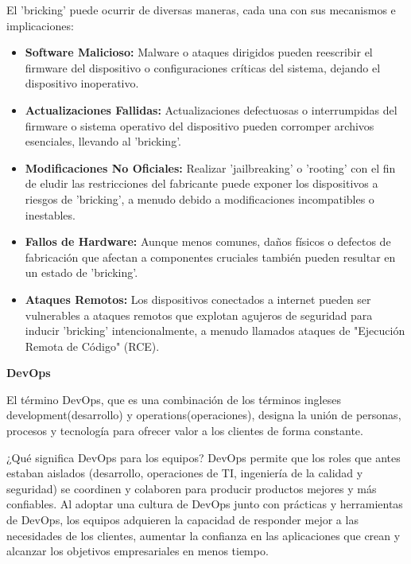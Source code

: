 El 'bricking' puede ocurrir de diversas maneras, cada una con sus mecanismos e implicaciones:
\begin{itemize}
    \item \textbf{Software Malicioso:} Malware o ataques dirigidos pueden reescribir el firmware del dispositivo o configuraciones críticas del sistema, dejando el dispositivo inoperativo.
    \item \textbf{Actualizaciones Fallidas:} Actualizaciones defectuosas o interrumpidas del firmware o sistema operativo del dispositivo pueden corromper archivos esenciales, llevando al 'bricking'.
    \item \textbf{Modificaciones No Oficiales:} Realizar 'jailbreaking' o 'rooting' con el fin de eludir las restricciones del fabricante puede exponer los dispositivos a riesgos de 'bricking', a menudo debido a modificaciones incompatibles o inestables.
    \item \textbf{Fallos de Hardware:} Aunque menos comunes, daños físicos o defectos de fabricación que afectan a componentes cruciales también pueden resultar en un estado de 'bricking'.
    \item \textbf{Ataques Remotos:} Los dispositivos conectados a internet pueden ser vulnerables a ataques remotos que explotan agujeros de seguridad para inducir 'bricking' intencionalmente, a menudo llamados ataques de "Ejecución Remota de Código" (RCE). \cite{vpnunlimited2024}
\end{itemize}
\vspace{1cm}

\textbf{DevOps}

El término DevOps, que es una combinación de los términos ingleses development(desarrollo) y operations(operaciones), designa la unión de personas, procesos y tecnología para ofrecer valor a los clientes de forma constante.

¿Qué significa DevOps para los equipos? DevOps permite que los roles que antes estaban aislados (desarrollo, operaciones de TI, ingeniería de la calidad y seguridad) se coordinen y colaboren para producir productos mejores y más confiables. Al adoptar una cultura de DevOps junto con prácticas y herramientas de DevOps, los equipos adquieren la capacidad de responder mejor a las necesidades de los clientes, aumentar la confianza en las aplicaciones que crean y alcanzar los objetivos empresariales en menos tiempo.\cite{MicrosoftDevOps}

